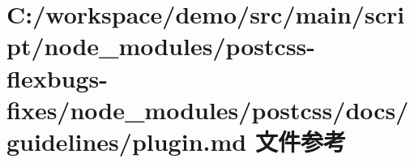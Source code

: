 \hypertarget{postcss-flexbugs-fixes_2node__modules_2postcss_2docs_2guidelines_2plugin_8md}{}\section{C\+:/workspace/demo/src/main/script/node\+\_\+modules/postcss-\/flexbugs-\/fixes/node\+\_\+modules/postcss/docs/guidelines/plugin.md 文件参考}
\label{postcss-flexbugs-fixes_2node__modules_2postcss_2docs_2guidelines_2plugin_8md}
